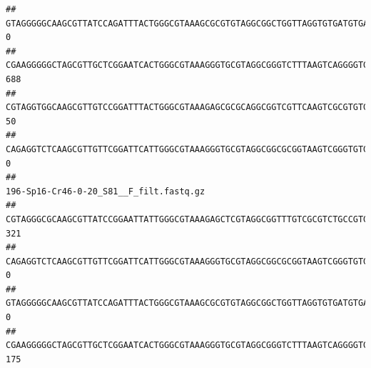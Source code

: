 \documentclass[]{article}
\begin{document}
\begin{verbatim}
## GTAGGGGGCAAGCGTTATCCAGATTTACTGGGCGTAAAGCGCGTGTAGGCGGCTGGTTAGGTGTGATGTGAAATCTTCCGGCTCAACCGGAAAACTGCATTGCAAACCGGCCTGGCTAGAGTGCAGGAGAGGGAAGCGGAATTCCAGGTGTAGCGGTGAAATGCGTAGATATCTGGAGGAACACCAGTGGCGAAGGCGGCTTCCTGGCCTGCAACTGACGCTGAGACGCGAAAGCGTGGGGAGCGAAC                                        0
## CGAAGGGGGCTAGCGTTGCTCGGAATCACTGGGCGTAAAGGGTGCGTAGGCGGGTCTTTAAGTCAGGGGTGAAATCCTGGAGCTCAACTCCAGAACTGCCTTTGATACTGAAGATCTTGAGTTCGGGAGAGGTGAGTGGAACTGCGAGTGTAGAGGTGAAATTCGTAGATATTCGCAAGAACACCAGTGGCGAAGGCGGCTCACTGGCCCGATACTGACGCTGAGGCACGAAAGCGTGGGGAGCAAACA                                     688
## CGTAGGTGGCAAGCGTTGTCCGGATTTACTGGGCGTAAAGAGCGCGCAGGCGGTCGTTCAAGTCGCGTGTGAAAGCCCCCGGCTCAACTGGGGAGGGTCACGCGATACTGATCGACTCGAAGGCAGGAGAGGGTAGTGGAATTCCCGGTGTAGTGGTGAAATGCGTAGATATCGGGAGGAACACCAGTGGCGAAGGCGACTACCTGGCCTGTTCTTGACGCTGAGGCGCGAAAGCTAGGGGAGCAAACG                                      50
## CAGAGGTCTCAAGCGTTGTTCGGATTCATTGGGCGTAAAGGGTGCGTAGGCGGCGCGGTAAGTCGGGTGTGAAATCTCGGGGCTTAACTCCGAAACTGCATTCGATACTGCCGTGCTTGAGGACTGGAGAGGAGACTGGAATTTACGGTGTAGCGGTGAAATGCGTAGATATCGTAAGGAAGACCAGTGGCGAAGGCGGGTCTCTGGACAGTTCCTGACGCTGAGGCACGAAGGCCAGGGGAGCAAACG                                       0
##                                                                                                                                                                                                                                                           196-Sp16-Cr46-0-20_S81__F_filt.fastq.gz
## CGTAGGGCGCAAGCGTTATCCGGAATTATTGGGCGTAAAGAGCTCGTAGGCGGTTTGTCGCGTCTGCCGTGAAAGTCCGGGGCTCAACTCCGGATCTGCGGTGGGTACGGGCAGACTAGAGTGATGTAGGGGAGACTGGAATTCCTGGTGTAGCGGTGAAATGCGCAGATATCAGGAGGAACACCGATGGCGAAGGCAGGTCTCTGGGCATTAACTGACGCTGAGGAGCGAAAGCATGGGGAGCGAACA                                     321
## CAGAGGTCTCAAGCGTTGTTCGGATTCATTGGGCGTAAAGGGTGCGTAGGCGGCGCGGTAAGTCGGGTGTGAAATCTCGGAGCTTAACTCCGAAACTGCATTCGATACTGCCGTGCTTGAGGACTGGAGAGGAGACTGGAATTTACGGTGTAGCGGTGAAATGCGTAGATATCGTAAGGAAGACCAGTGGCGAAGGCGGGTCTCTGGACAGTTCCTGACGCTGAGGCACGAAGGCCAGGGGAGCAAACG                                       0
## GTAGGGGGCAAGCGTTATCCAGATTTACTGGGCGTAAAGCGCGTGTAGGCGGCTGGTTAGGTGTGATGTGAAATCTTCCGGCTCAACCGGAAAACTGCATTGCAAACCGGCCTGGCTAGAGTGCAGGAGAGGGAAGCGGAATTCCAGGTGTAGCGGTGAAATGCGTAGATATCTGGAGGAACACCAGTGGCGAAGGCGGCTTCCTGGCCTGCAACTGACGCTGAGACGCGAAAGCGTGGGGAGCGAAC                                        0
## CGAAGGGGGCTAGCGTTGCTCGGAATCACTGGGCGTAAAGGGTGCGTAGGCGGGTCTTTAAGTCAGGGGTGAAATCCTGGAGCTCAACTCCAGAACTGCCTTTGATACTGAAGATCTTGAGTTCGGGAGAGGTGAGTGGAACTGCGAGTGTAGAGGTGAAATTCGTAGATATTCGCAAGAACACCAGTGGCGAAGGCGGCTCACTGGCCCGATACTGACGCTGAGGCACGAAAGCGTGGGGAGCAAACA                                     175

\end{verbatim}
\end{document}
